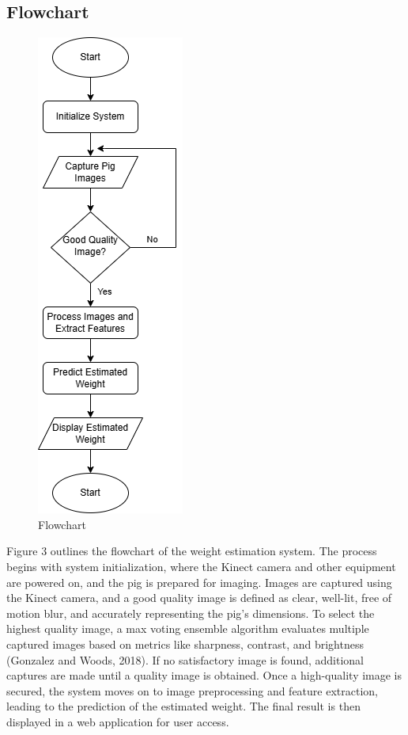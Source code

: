 {\subsection {Flowchart}
\begin{figure}[h]
	\centering
	\includegraphics[height=0.6\textheight]{figures/Thesis Flowchart}
	\caption{Flowchart}
	\label{fig:Flowchart}
\end{figure}

Figure 3 outlines the flowchart of the weight estimation system. The process begins with system initialization, where the Kinect camera and other equipment are powered on, and the pig is prepared for imaging. Images are captured using the Kinect camera, and a good quality image is defined as clear, well-lit, free of motion blur, and accurately representing the pig's dimensions. To select the highest quality image, a max voting ensemble algorithm evaluates multiple captured images based on metrics like sharpness, contrast, and brightness (Gonzalez and Woods, 2018). If no satisfactory image is found, additional captures are made until a quality image is obtained. Once a high-quality image is secured, the system moves on to image preprocessing and feature extraction, leading to the prediction of the estimated weight. The final result is then displayed in a web application for user access.
}

